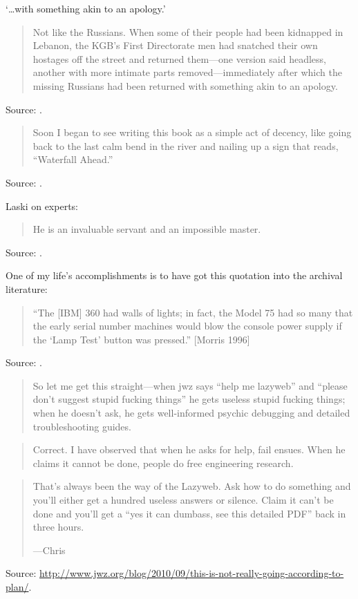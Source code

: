 \documentclass[a4paper]{article}
\begin{document}
`\ldots with something akin to an apology.'
\begin{quote}
	Not like the Russians.	When some of their people had been
	kidnapped in Lebanon, the KGB's First Directorate men had
	snatched their own hostages off the street and returned
	them---one version said headless, another with more intimate
	parts removed---immediately after which the missing Russians
	had been returned with something akin to an apology.
\end{quote}
Source: \citet{Clancy1989}.
\medskip

\begin{quote}
	Soon I began to see writing this book as a simple act of decency,
	like going back to the last calm bend in the river and nailing up
	a sign that reads, ``Waterfall Ahead.''
\end{quote}
Source: \citet[p.~4]{Robinson1994}.
\medskip

Laski on experts:
\begin{quote}
	He is an invaluable servant and an impossible master.
\end{quote}
Source: \citep[p.106]{Laski1930}.
\medskip

One of my life's accomplishments is to have got this quotation into the
archival literature:
\begin{quote}
	``The [IBM] 360 had walls of lights; in fact, the Model 75 had so many
	that the early serial number machines would blow the console power
	supply if the `Lamp Test' button was pressed.'' [Morris 1996]
\end{quote}
Source: \citet[p.~265]{Loughry2002a}.
\medskip

\begin{quote}
	So let me get this straight---when jwz says ``help me lazyweb''
	and ``please don't suggest stupid fucking things'' he gets useless
	stupid fucking things; when he doesn't ask, he gets well-informed
	psychic debugging and detailed troubleshooting guides.
\end{quote}
\begin{quote}
	Correct. I have observed that when he asks for help, fail ensues.
	When he claims it cannot be done, people do free engineering research.
\end{quote}
\begin{quote}
	That's always been the way of the Lazyweb. Ask how to do something
	and you'll either get a hundred useless answers or silence. Claim
	it can't be done and you'll get a ``yes it can dumbass, see this
	detailed PDF'' back in three hours.

	---Chris
\end{quote}
Source: \url{http://www.jwz.org/blog/2010/09/this-is-not-really-going-according-to-plan/}.
\medskip
\end{document}

